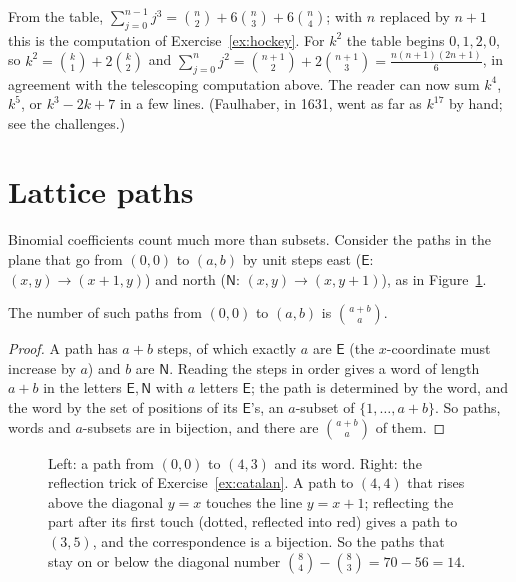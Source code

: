 \begin{examplex}
From the table, $\sum_{j=0}^{n-1}j^3=\binom n2+6\binom n3+6\binom n4$; with $n$ replaced by $n+1$ this is the computation of Exercise~\ref{ex:hockey}.
For $k^2$ the table begins $0,1,2,0$, so $k^2=\binom k1+2\binom k2$ and $\sum_{j=0}^{n}j^2=\binom{n+1}2+2\binom{n+1}3=\frac{n(n+1)(2n+1)}6$, in agreement
with the telescoping computation above. The reader can now sum $k^4$, $k^5$, or $k^3-2k+7$ in a few lines. (Faulhaber, in 1631, went as far as $k^{17}$ by hand; see the challenges.)
\end{examplex}

\section{Lattice paths}

Binomial coefficients count much more than subsets. Consider the paths in the plane that go from $(0,0)$ to $(a,b)$ by unit steps east
($\mathsf E$: $(x,y)\to(x+1,y)$) and north ($\mathsf N$: $(x,y)\to(x,y+1)$), as in Figure~\ref{fig:paths}.

\begin{proposition}\label{prop:paths}
The number of such paths from $(0,0)$ to $(a,b)$ is $\binom{a+b}a$.
\end{proposition}
\begin{proof}
A path has $a+b$ steps, of which exactly $a$ are $\mathsf E$ (the $x$-coordinate must increase by $a$) and $b$ are $\mathsf N$. Reading the steps in
order gives a word of length $a+b$ in the letters $\mathsf E,\mathsf N$ with $a$ letters $\mathsf E$; the path is determined by the word, and the word by the set of positions of its
$\mathsf E$'s, an $a$-subset of $\{1,\dots,a+b\}$. So paths, words and $a$-subsets are in bijection, and there are $\binom{a+b}a$ of them.
\end{proof}

\begin{figure}[ht]
\centering
{}
\caption{Left: a path from $(0,0)$ to $(4,3)$ and its word. Right: the reflection trick of Exercise~\ref{ex:catalan}. A path to $(4,4)$ that rises above the diagonal $y=x$ touches the line $y=x+1$; reflecting the part after its first touch (dotted, reflected into red) gives a path to $(3,5)$, and the correspondence is a bijection. So the paths that stay on or below the diagonal number $\binom84-\binom83=70-56=14$.}
\label{fig:paths}
\end{figure}


